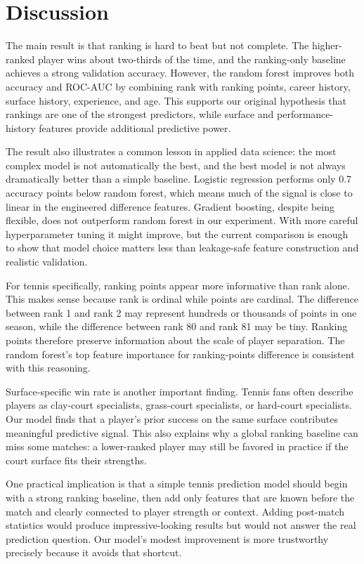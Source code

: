 \documentclass{article}
\begin{document}
\section{Discussion}
\label{sec:discussion}

The main result is that ranking is hard to beat but not complete. The higher-ranked player wins about two-thirds of the time, and the ranking-only baseline achieves a strong validation accuracy. However, the random forest improves both accuracy and ROC-AUC by combining rank with ranking points, career history, surface history, experience, and age. This supports our original hypothesis that rankings are one of the strongest predictors, while surface and performance-history features provide additional predictive power.

The result also illustrates a common lesson in applied data science: the most complex model is not automatically the best, and the best model is not always dramatically better than a simple baseline. Logistic regression performs only 0.7 accuracy points below random forest, which means much of the signal is close to linear in the engineered difference features. Gradient boosting, despite being flexible, does not outperform random forest in our experiment. With more careful hyperparameter tuning it might improve, but the current comparison is enough to show that model choice matters less than leakage-safe feature construction and realistic validation.

For tennis specifically, ranking points appear more informative than rank alone. This makes sense because rank is ordinal while points are cardinal. The difference between rank 1 and rank 2 may represent hundreds or thousands of points in one season, while the difference between rank 80 and rank 81 may be tiny. Ranking points therefore preserve information about the scale of player separation. The random forest's top feature importance for ranking-points difference is consistent with this reasoning.

Surface-specific win rate is another important finding. Tennis fans often describe players as clay-court specialists, grass-court specialists, or hard-court specialists. Our model finds that a player's prior success on the same surface contributes meaningful predictive signal. This also explains why a global ranking baseline can miss some matches: a lower-ranked player may still be favored in practice if the court surface fits their strengths.

One practical implication is that a simple tennis prediction model should begin with a strong ranking baseline, then add only features that are known before the match and clearly connected to player strength or context. Adding post-match statistics would produce impressive-looking results but would not answer the real prediction question. Our model's modest improvement is more trustworthy precisely because it avoids that shortcut.
\end{document}
